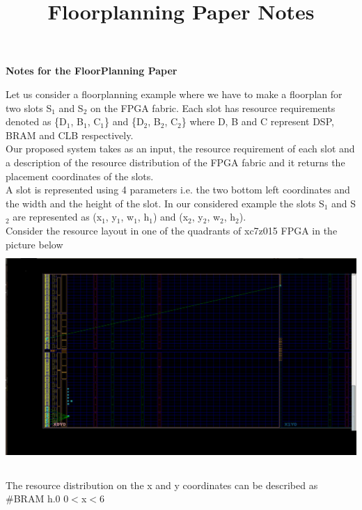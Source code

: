 \documentclass[11pt]{article}
\theoremstyle{definition}
\begin{document}
\setcounter{section}{8}
\title{Floorplanning Paper Notes}

\thispagestyle{empty}

\begin{center}
{\LARGE \bf Notes for the FloorPlanning Paper}\\
\end{center}

Let us consider a floorplanning example where we have to make a floorplan for two slots S$_1$ and S$_2$ on the FPGA fabric. Each slot has resource requirements denoted as \{D$_1$, B$_1$, C$_1$\} and \{D$_2$, B$_2$, C$_2$\} where D, B and C represent DSP, BRAM and CLB respectively. \\ Our proposed system takes as an input, the resource requirement of each slot and a description of the resource distribution of the FPGA fabric and it returns the placement coordinates of the slots. \\
A slot is represented using 4 parameters i.e. the two bottom left coordinates and the width and the height of the slot. In our considered example the slots S$_1$ and S$_2$ are represented as (x$_1$, y$_1$, w$_1$, h$_1$) and (x$_2$, y$_2$, w$_2$, h$_2$). \\

Consider the resource layout in one of the quadrants of xc7z015 FPGA in the picture below
\includegraphics[width=\textwidth, height=8cm]{graphics/fpga.png} \\ \\

The resource distribution on the x and y coordinates can be described as \\

\hspace{15mm} \#BRAM \hspace{15mm} h.0 \hspace{10mm}  0$<$x$<$6 
   
\end{document}
